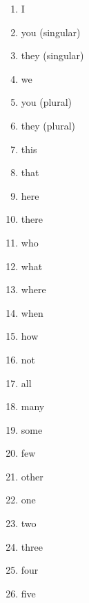 \begin{multicols}{2}
\begin{enumerate}
\item   I 

\item   you (singular) 

\item   they (singular) 

\item   we 

\item   you (plural) 

\item   they (plural) 

\item   this 

\item   that 

\item   here 

\item   there 

\item   who 

\item   what 

\item   where 

\item   when 

\item   how 

\item   not 

\item   all 

\item   many 

\item   some 

\item   few 

\item   other 

\item   one 

\item   two 

\item   three 

\item   four 

\item   five 


\end{enumerate}
\end{multicols}
